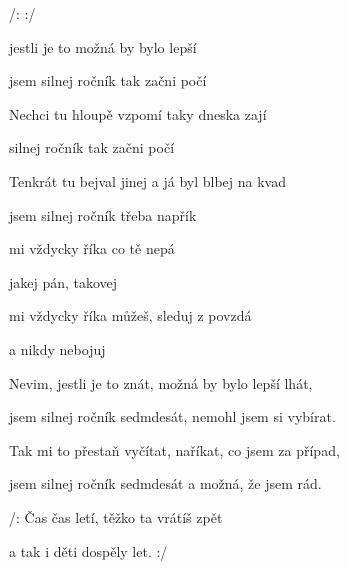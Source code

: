 

/:     :/

\zs

 jestli je to 
možná by bylo lepší 

jsem silnej ročník  tak začni počí

Nechci tu hloupě vzpomí taky dneska zají

silnej ročník  tak začni počí

Tenkrát tu bejval jinej  a já byl blbej na kvad

jsem silnej ročník  třeba napřík
\ks

\zr
{} mi vždycky říka co tě nepá

jakej pán, takovej 

 mi vždycky říka můžeš, sleduj z povzdá

a nikdy nebojuj 
\kr

\zs
Nevim, jestli je to znát, možná by bylo lepší lhát,

jsem silnej ročník sedmdesát, nemohl jsem si vybírat.

Tak mi to přestaň vyčítat, naříkat, co jsem za případ,

jsem silnej ročník sedmdesát a možná, že jsem rád.
\ks

\zr

\kr


\zs
/: Čas  čas letí, těžko ta  vrátíš zpět

a tak i  děti dospěly  let. :/
\ks

\kp
